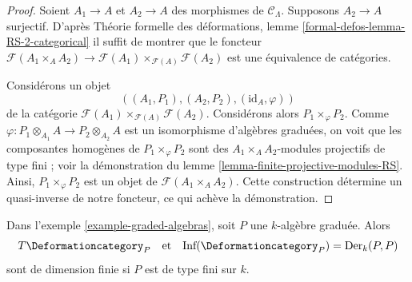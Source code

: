 \begin{proof}
Soient $A_1 \to A$ et $A_2 \to A$ des morphismes de $\mathcal{C}_\Lambda$.
Supposons $A_2 \to A$ surjectif. D'après Théorie formelle
des déformations, lemme
\ref{formal-defos-lemma-RS-2-categorical}
il suffit de montrer que le foncteur
$\mathcal{F}(A_1 \times_A A_2) \to
\mathcal{F}(A_1) \times_{\mathcal{F}(A)} \mathcal{F}(A_2)$
est une équivalence de catégories.

\medskip\noindent
Considérons un objet
$$
((A_1, P_1), (A_2, P_2), (\text{id}_A, \varphi))
$$
de la catégorie $\mathcal{F}(A_1) \times_{\mathcal{F}(A)} \mathcal{F}(A_2)$.
Considérons alors $P_1 \times_\varphi P_2$. Comme
$\varphi : P_1 \otimes_{A_1} A \to P_2 \otimes_{A_2} A$
est un isomorphisme d'algèbres graduées, on voit que les composantes homogènes
de $P_1 \times_\varphi P_2$ sont des $A_1 \times_A A_2$-modules projectifs de type fini ;
voir la démonstration du lemme \ref{lemma-finite-projective-modules-RS}.
Ainsi, $P_1 \times_\varphi P_2$ est un objet de $\mathcal{F}(A_1 \times_A A_2)$.
Cette construction détermine un quasi-inverse de notre foncteur,
ce qui achève la démonstration.
\end{proof}

\begin{lemma}
\label{lemma-graded-algebras-TI}
Dans l'exemple \ref{example-graded-algebras}, soit $P$ une $k$-algèbre graduée.
Alors
$$
T\Deformationcategory_P
\quad\text{et}\quad
\text{Inf}(\Deformationcategory_P) = \text{Der}_k(P, P)
$$
sont de dimension finie si $P$ est de type fini sur $k$.
\end{lemma}

